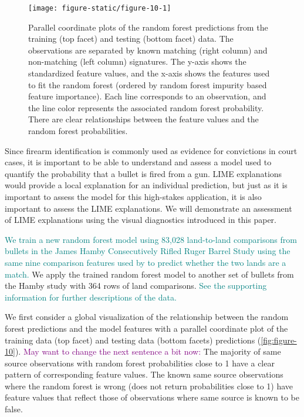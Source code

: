 \documentclass[AMS,STIX2COL]{WileyNJD-v2}\usepackage[]{graphicx}\usepackage[]{color}
\newenvironment{knitrout}{}{} %
\newcommand{\kgc}[1]{\textcolor{purple}{#1}}
\newcommand{\kge}[1]{\textcolor{teal}{#1}}
\begin{document}
\begin{figure}[!thp]
\begin{knitrout}
\color{fgcolor}

{\centering \texttt{[image: figure-static/figure-10-1]} 

}



\end{knitrout}
\caption{Parallel coordinate plots of the \citet{hare:2017} random forest predictions from the training (top facet) and testing (bottom facet) data. The observations are separated by known matching (right column) and non-matching (left column) signatures. The y-axis shows the standardized feature values, and the x-axis shows the features used to fit the random forest (ordered by random forest impurity based feature importance). Each line corresponds to an observation, and the line color represents the associated random forest probability. There are clear relationships between the feature values and the random forest probabilities.}
\label{fig:figure-10}
\end{figure}

Since firearm identification is commonly used as evidence for convictions in court cases, it is important to be able to understand and assess a model used to quantify the probability that a bullet is fired from a gun. LIME explanations would provide a local explanation for an individual prediction, but just as it is important to assess the model for this high-stakes application, it is also important to assess the LIME explanations. We will demonstrate an assessment of LIME explanations using the visual diagnostics introduced in this paper.

\kge{We train a new random forest model using 83,028 land-to-land comparisons from bullets in the James Hamby Consecutively Rifled Ruger Barrel Study \citep{hamby:2009} using the same nine comparison features used by \citet{hare:2017} to predict whether the two lands are a match.} We apply the trained random forest model to another set of bullets from the Hamby study with 364 rows of land comparisons. \kge{See the supporting information for further descriptions of the data.} 

We first consider a global visualization of the relationship between the random forest predictions and the model features with a parallel coordinate plot of the training data (top facet) and testing data (bottom facets) predictions (\autoref{fig:figure-10}). \kgc{May want to change the next sentence a bit now:} The majority of same source observations with random forest probabilities close to 1 have a clear pattern of corresponding feature values. The known same source observations where the random forest is wrong (does not return probabilities close to 1) have feature values that reflect those of observations where same source is known to be false.
\end{document}
